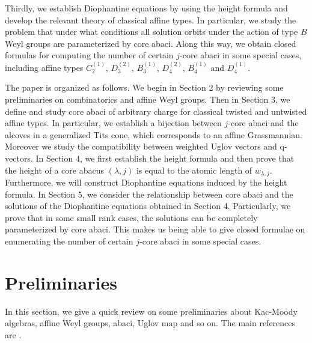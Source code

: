 \documentclass[11pt]{amsart}
\theoremstyle{plain}
\numberwithin{equation}{subsection}
\newcommand{\lam}{\lambda}
\begin{document}
Thirdly, we establish Diophantine equations by using the height formula and develop the relevant theory of classical affine types.
In particular, we study the problem that under what conditions all solution orbits under the action of type $B$ Weyl groups are parameterized by core abaci. 
Along this way, we obtain closed formulas for computing the number of certain $j$-core abaci in some special cases, 
including affine types $C_2^{(1)}$, $D_3^{(2)}$, $B_3^{(1)}$, $D_4^{(2)}$, $B_4^{(1)}$ and $D_4^{(1)}$.

\smallskip

The paper is organized as follows. We begin in Section 2 by reviewing some preliminaries on combinatorics and affine Weyl groups.
Then in Section 3, we define and study core abaci of arbitrary charge for classical twisted and untwisted affine types. 
In particular, we establish a bijection between $j$-core abaci and the alcoves in a generalized Tits cone, which corresponds to an affine Grassmannian.
Moreover we study the compatibility between weighted Uglov vectors and $\mathrm q$-vectors.   
In Section 4, we first establish the height formula and then 
prove that the height of a core abacus $(\lam, j)$ is equal to the atomic length of $w_{\lam, j}$.
Furthermore, we will construct Diophantine equations induced by the height formula.
In Section 5, we consider the relationship between core abaci and the solutions of the Diophantine equations
obtained in Section 4. Particularly, we prove that in some small rank cases, the solutions can be completely parameterized by core abaci.
This makes us being able to give closed formulae on enumerating the number of certain $j$-core abaci in some special cases.

\bigskip


\section{Preliminaries}
In this section, we give a quick review on some preliminaries about Kac-Moody algebras, 
affine Weyl groups, abaci, Uglov map and so on. The main references are \cite{HLQ, Kac}.
\end{document}
